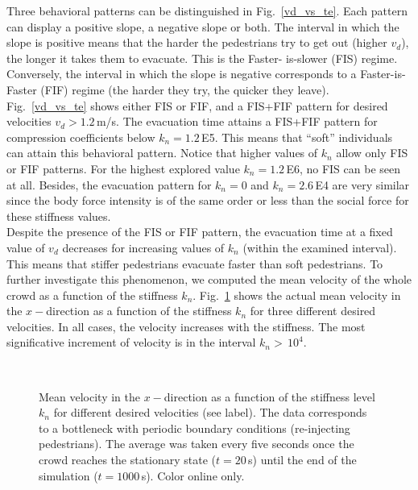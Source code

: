 \documentclass[preprint,12pt]{elsarticle}
\begin{document}
Three behavioral patterns can be distinguished in Fig.~\ref{vd_vs_te}.  Each
pattern can display a positive slope, a negative slope or both. The interval in
which the slope is positive means that the  harder the pedestrians try to get
out (higher $v_d$), the  longer it takes them to evacuate. This is the Faster-
is-slower  (FIS) regime. Conversely, the interval in which the slope is
negative  corresponds to a Faster-is-Faster (FIF) regime (the  harder they try,
the quicker they leave).\\

Fig.~\ref{vd_vs_te}  shows either FIS or FIF, and a FIS+FIF pattern for desired
velocities $v_d>1.2\,$m/s. The  evacuation time attains a FIS+FIF pattern for
compression coefficients below  $k_n=1.2\,$E5. This means that ``soft''
individuals can attain this  behavioral pattern.  Notice that higher values of
$k_n$ allow  only FIS or FIF patterns. For the highest explored value
$k_n=1.2\,$E6, no  FIS can be seen at all. Besides, the evacuation pattern for
$k_n = 0$ and $k_n  = 2.6\,$E4 are very similar since the body force intensity
is of the same order or less than the social  force for these stiffness values.
\\

Despite the presence of the FIS or FIF pattern, the evacuation time at a  fixed
value of $v_d$ decreases for increasing values of $k_n$ (within the examined
interval).  This means that stiffer pedestrians evacuate faster than soft
pedestrians.  To further investigate this  phenomenon, we computed the mean
velocity of the whole crowd as a function of the  stiffness $k_n$.
Fig.~\ref{kn_vs_vx_bottleneck} shows the actual mean velocity in the
$x-$direction as a function of the stiffness $k_n$ for three different desired
velocities. In all cases, the velocity increases with the stiffness. The most
significative  increment of velocity is in the interval $k_n>\,10^{4}$. \\


\begin{figure}[!htbp]
\centering
{}\\
\caption[width=0.47\columnwidth]{Mean velocity in the $x-$direction as a
function  of the stiffness level $k_n$ for different desired velocities (see
label). The  data corresponds to a bottleneck with periodic boundary conditions
(re-injecting  pedestrians). The average was taken every five seconds once the
crowd reaches the  stationary state ($t=20\,$s) until the end of the simulation
($t=1000\,$s).  Color online only. }
\label{kn_vs_vx_bottleneck}
\end{figure}
\end{document}
